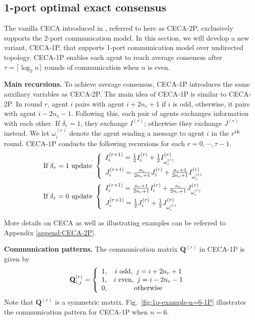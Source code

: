 \documentclass{article}
\newcommand{\vQ}{\mathbf{Q}}
\newcommand{\ro}{{(r)}}
\theoremstyle{plain}
\theoremstyle{definition}
\begin{document}
\subsection{1-port optimal exact consensus}
\label{sec:1p-opt-allreduce-ave}
{The vanilla CECA introduced in \cite{bar1993optimal}, referred to here as CECA-2P, exclusively supports the 2-port communication model.} {In this section, we} will develop a new variant, CECA-1P, that supports 1-port communication model over undirected topology. CECA-1P enables each agent to reach average consensus after $\tau=\lceil \log_2 n \rceil$ rounds of communication when $n$ is even.

\textbf{Main recursions.} To achieve average consensus, CECA-1P introduces the same auxiliary variables as CECA-2P. The main idea of CECA-1P is similar to CECA-2P. In round $r$, agent $i$ pairs with agent $i+2n_r + 1$ if $i$ is odd, otherwise, it pairs with agent $i-2n_r - 1$. Following this, each pair of agents exchanges information with each other. If $\delta_r = 1$, they exchange $I^{(r)}$; otherwise they exchange $J^{(r)}$ instead. {We let ${\omega^\ro_i}$ denote the agent sending a message to agent $i$ in the $r^{\textup{th}}$ round.} CECA-1P conducts the following recursions for each $r=0,\cdots, \tau-1$.
\begin{align*}
&\mbox{If $\delta_r=1$ update }\left\{
\begin{array}{lc}
I^{(r+1)}_i=\frac{1}{2}I^\ro_i+\frac{1}{2}I^\ro_{\omega^\ro_i}     &  \vspace{1mm}\\
J^{(r+1)}_i=\frac{n_r}{2n_r+1}J^\ro_i+\frac{n_r+1}{2n_r+1}I^\ro_{\omega^\ro_i}     & 
\end{array}
\right. \vspace{2mm}\\
&\mbox{If $\delta_r=0$ update }\left\{
\begin{array}{lc}
I^{(r+1)}_i=\frac{n_r+1}{2n_r+1}I^\ro_i+\frac{n_r}{2n_r+1}J^\ro_{\omega^\ro_i}    &  \vspace{1mm}\\
J^{(r+1)}_i=\frac{1}{2}J^\ro_i+\frac{1}{2}J^\ro_{\omega^\ro_i}    & 
\end{array}
\right.
\end{align*}

More details on CECA as well as illustrating examples can be referred to Appendix \ref{append:CECA-2P}. 

\textbf{Communication patterns.} The communication matrix $\vQ^\ro$ in CECA-1P is given by
\begin{equation}
\label{eq:1p-gossip-matrix}
\vQ^\ro_{i,j}=
\left\{
\begin{array}{cc}
    1, & i \textup{ odd},~ j=i+2n_r+1 \\
    1, & i \textup{ even},~ j=i-2n_r-1 \\
    0, & \textup{otherwise}
\end{array}
\right.
\end{equation}
Note that $\vQ^\ro$ is a symmetric matrix. Fig.~\ref{fig:1p-example-n=6-1P} illustrates the communication pattern for CECA-1P when $n=6$. 
\end{document}

